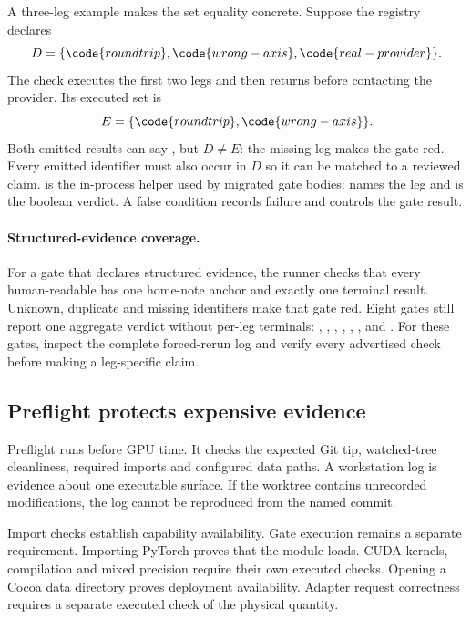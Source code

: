 A three-leg example makes the set equality concrete.  Suppose the registry
declares
\begin{equation*}
 D=\{\code{roundtrip},\code{wrong-axis},\code{real-provider}\}.
\end{equation*}
The check executes the first two legs and then returns before contacting the
provider.  Its executed set is
\begin{equation*}
 E=\{\code{roundtrip},\code{wrong-axis}\}.
\end{equation*}
Both emitted results can say , but $D\ne E$: the missing
 leg makes the gate red.  Every emitted identifier must
also occur in $D$ so it can be matched to a reviewed claim.
 is the in-process helper
used by migrated gate bodies:  names the leg and 
is the boolean verdict.  A false condition records failure and controls the
gate result.

\paragraph{Structured-evidence coverage.}
For a gate that declares structured evidence, the runner checks that every
human-readable  has one home-note anchor and exactly
one terminal result.  Unknown, duplicate and missing identifiers make that
gate red.  Eight gates still report one aggregate verdict without per-leg
terminals: , ,
, ,
, ,  and
.  For these gates, inspect the complete forced-rerun log
and verify every advertised check before making a leg-specific claim.

\subsection{Preflight protects expensive evidence}

Preflight runs before GPU time.  It checks the expected Git tip, watched-tree
cleanliness, required imports and configured data paths.  A workstation log
is evidence about one executable surface.  If the worktree contains
unrecorded modifications, the log cannot be reproduced from the named commit.

Import checks establish capability availability.  Gate execution remains a
separate requirement.  Importing PyTorch proves that the module loads.  CUDA
kernels, compilation and mixed precision require their own executed checks.
Opening a Cocoa data directory proves deployment availability.  Adapter
request correctness requires a separate executed check of the physical
quantity.

